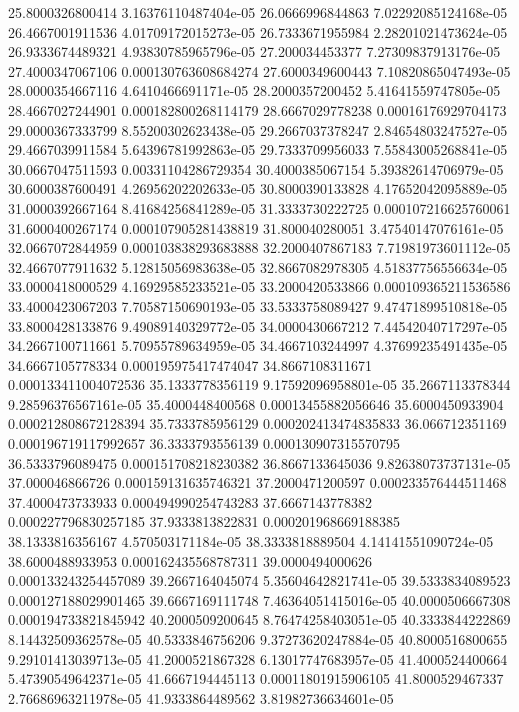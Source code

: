 {25.8000326800414 3.16376110487404e-05
26.0666996844863 7.02292085124168e-05
26.4667001911536 4.01709172015273e-05
26.7333671955984 2.28201021473624e-05
26.9333674489321 4.93830785965796e-05
27.200034453377 7.27309837913176e-05
27.4000347067106 0.000130763608684274
27.6000349600443 7.10820865047493e-05
28.0000354667116 4.6410466691171e-05
28.2000357200452 5.41641559747805e-05
28.4667027244901 0.000182800268114179
28.6667029778238 0.00016176929704173
29.0000367333799 8.55200302623438e-05
29.2667037378247 2.84654803247527e-05
29.4667039911584 5.64396781992863e-05
29.7333709956033 7.55843005268841e-05
30.0667047511593 0.00331104286729354
30.4000385067154 5.39382614706979e-05
30.6000387600491 4.26956202202633e-05
30.8000390133828 4.17652042095889e-05
31.0000392667164 8.41684256841289e-05
31.3333730222725 0.000107216625760061
31.6000400267174 0.000107905281438819
31.800040280051 3.47540147076161e-05
32.0667072844959 0.000103838293683888
32.2000407867183 7.71981973601112e-05
32.4667077911632 5.12815056983638e-05
32.8667082978305 4.51837756556634e-05
33.0000418000529 4.16929585233521e-05
33.2000420533866 0.000109365211536586
33.4000423067203 7.70587150690193e-05
33.5333758089427 9.47471899510818e-05
33.8000428133876 9.49089140329772e-05
34.0000430667212 7.44542040717297e-05
34.2667100711661 5.70955789634959e-05
34.4667103244997 4.37699235491435e-05
34.6667105778334 0.000195975417474047
34.8667108311671 0.000133411004072536
35.1333778356119 9.17592096958801e-05
35.2667113378344 9.28596376567161e-05
35.4000448400568 0.00013455882056646
35.6000450933904 0.000212808672128394
35.7333785956129 0.000202413474835833
36.066712351169 0.000196719117992657
36.3333793556139 0.000130907315570795
36.5333796089475 0.000151708218230382
36.8667133645036 9.82638073737131e-05
37.000046866726 0.000159131635746321
37.2000471200597 0.000233576444511468
37.4000473733933 0.000494990254743283
37.6667143778382 0.000227796830257185
37.9333813822831 0.000201968669188385
38.1333816356167 4.570503171184e-05
38.3333818889504 4.14141551090724e-05
38.6000488933953 0.000162435568787311
39.0000494000626 0.000133243254457089
39.2667164045074 5.35604642821741e-05
39.5333834089523 0.000127188029901465
39.6667169111748 7.46364051415016e-05
40.0000506667308 0.000194733821845942
40.2000509200645 8.76474258403051e-05
40.3333844222869 8.14432509362578e-05
40.5333846756206 9.37273620247884e-05
40.8000516800655 9.29101413039713e-05
41.2000521867328 6.13017747683957e-05
41.4000524400664 5.47390549642371e-05
41.6667194445113 0.00011801915906105
41.8000529467337 2.76686963211978e-05
41.9333864489562 3.81982736634601e-05
}
